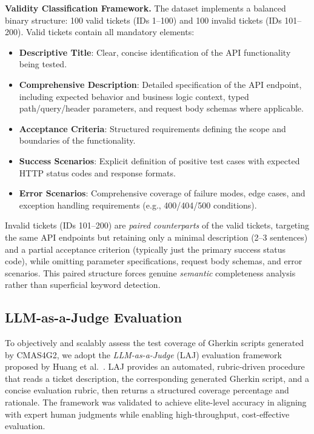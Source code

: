 \documentclass[runningheads]{llncs}
\begin{document}
\noindent \textbf{Validity Classification Framework.}
The dataset implements a balanced binary structure: 100 valid tickets (IDs 1--100) and 100 invalid tickets (IDs 101--200).
Valid tickets contain all mandatory elements:
\begin{itemize}
\item \textbf{Descriptive Title}: Clear, concise identification of the API functionality being tested.
\item \textbf{Comprehensive Description}: Detailed specification of the API endpoint, including expected behavior and business logic context, typed path/query/header parameters, and request body schemas where applicable.
\item \textbf{Acceptance Criteria}: Structured requirements defining the scope and boundaries of the functionality.
\item \textbf{Success Scenarios}: Explicit definition of positive test cases with expected HTTP status codes and response formats.
\item \textbf{Error Scenarios}: Comprehensive coverage of failure modes, edge cases, and exception handling requirements (e.g., 400/404/500 conditions).
\end{itemize}
Invalid tickets (IDs 101--200) are \emph{paired counterparts} of the valid tickets, targeting the same API endpoints but retaining only a minimal description (2--3 sentences) and a partial acceptance criterion (typically just the primary success status code), while omitting parameter specifications, request body schemas, and error scenarios. This paired structure forces genuine \emph{semantic} completeness analysis rather than superficial keyword detection.

\subsection{LLM-as-a-Judge Evaluation}
\label{sec:llm-as-a-judge}
To objectively and scalably assess the test coverage of Gherkin scripts generated by CMAS4G2, we adopt the \emph{LLM-as-a-Judge} (LAJ) evaluation framework proposed by Huang et al.~\cite{huang2025laj}. LAJ provides an automated, rubric-driven procedure that reads a ticket description, the corresponding generated Gherkin script, and a concise evaluation rubric, then returns a structured coverage percentage and rationale. The framework was validated to achieve elite-level accuracy in aligning with expert human judgments while enabling high-throughput, cost-effective evaluation.
\end{document}
